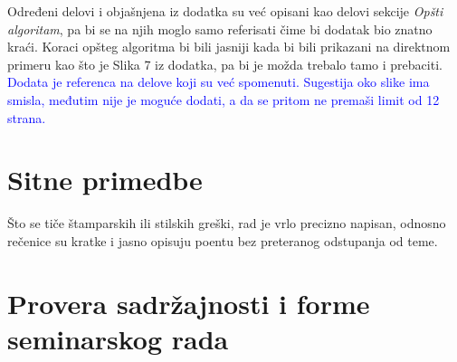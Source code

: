 \documentclass[a4paper]{report}
\newcommand{\odgovor}[1]{\textcolor{blue}{#1}}
\begin{document}
Određeni delovi i objašnjena iz dodatka su već opisani kao delovi sekcije \textit{Opšti algoritam}, pa bi se na njih moglo samo referisati čime bi dodatak bio znatno kraći. Koraci opšteg algoritma bi bili jasniji kada bi bili prikazani na direktnom primeru kao što je Slika 7 iz dodatka, pa bi je možda trebalo tamo i prebaciti.\\
\odgovor{Dodata je referenca na delove koji su već spomenuti. Sugestija oko slike ima smisla, međutim nije je moguće dodati, a da se pritom ne premaši limit od 12 strana.}

\section{Sitne primedbe}
Što se tiče štamparskih ili stilskih greški, rad je vrlo precizno napisan, odnosno rečenice su kratke i jasno opisuju poentu bez preteranog odstupanja od teme.

\section{Provera sadržajnosti i forme seminarskog rada}
\end{document}
